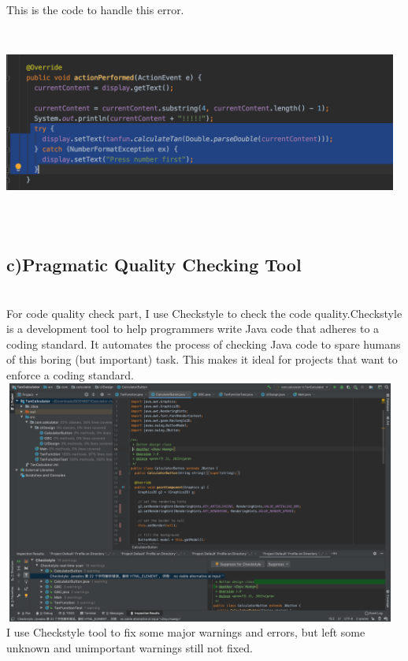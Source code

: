 \documentclass[letterpaper, 11pt]{report}
\begin{document}
\newline
This is the code to handle this error.\\
\newline
\includegraphics[width=13cm,height = 7cm]{err3}\\
\subsection*{c)Pragmatic Quality Checking Tool}\\
For code quality check part, I use Checkstyle to check the code quality.\cite{check}Checkstyle is a development tool to help programmers write Java code that adheres to a coding standard. It automates the process of checking Java code to spare humans of this boring (but important) task. This makes it ideal for projects that want to enforce a coding standard.\\
\newline
\includegraphics[width=13cm,height = 8cm]{check}\\
\newline
I use Checkstyle tool to fix some major warnings and errors, but left some unknown and unimportant warnings still not fixed.
\pagebreak
\newpage
{}
\end{document}
